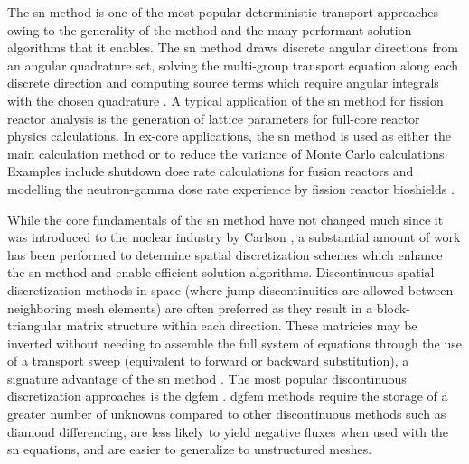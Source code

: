The \acrfull{sn} method is one of the most popular deterministic transport approaches owing to the generality of the method and the many performant solution algorithms that it enables. The \acrshort{sn} method draws discrete angular directions from an angular quadrature set, solving the multi-group transport equation along each discrete direction and computing source terms which require angular integrals with the chosen quadrature \cite{carlson_sn,computational_methods}. A typical application of the \acrshort{sn} method for fission reactor analysis is the generation of lattice parameters for full-core reactor physics calculations. In ex-core applications, the \acrshort{sn} method is used as either the main calculation method or to reduce the variance of Monte Carlo calculations. Examples include shutdown dose rate calculations for fusion reactors \cite{denovo_fusion,denovo_fusion_II} and modelling the neutron-gamma dose rate experience by fission reactor bioshields \cite{denovo_concrete}.

While the core fundamentals of the \acrshort{sn} method have not changed much since it was introduced to the nuclear industry by Carlson \cite{carlson_sn}, a substantial amount of work has been performed to determine spatial discretization schemes which enhance the \acrshort{sn} method and enable efficient solution algorithms. Discontinuous spatial discretization methods in space (where jump discontinuities are allowed between neighboring mesh elements) are often preferred as they result in a block-triangular matrix structure within each direction. These matricies may be inverted without needing to assemble the full system of equations through the use of a transport sweep (equivalent to forward or backward substitution), a signature advantage of the \acrshort{sn} method \cite{massively_parallel_sweeps,computational_methods}. The most popular discontinuous discretization approaches is the \acrshort{dgfem} \cite{schunert_sn_discretization,dgfem_1}. \acrshort{dgfem} methods require the storage of a greater number of unknowns compared to other discontinuous methods such as diamond differencing, are less likely to yield negative fluxes when used with the \acrshort{sn} equations, and are easier to generalize to unstructured meshes. 

